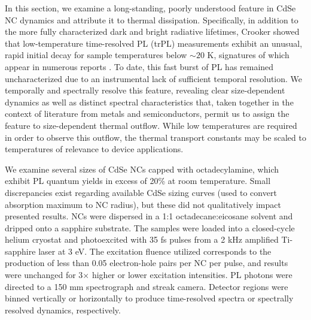 In this section, we examine a long-standing, poorly understood feature in CdSe NC dynamics and attribute it to thermal dissipation. Specifically, in addition to the more fully characterized dark and bright radiative lifetimes, Crooker showed that low-temperature time-resolved PL (trPL) measurements exhibit an unusual, rapid initial decay for sample temperatures below $\sim 20$ K, signatures of which appear in numerous reports \cite{:/content/aip/journal/jcp/96/2/10.1063/1.462114, :/content/aip/journal/apl/82/17/10.1063/1.1570923, doi:10.1021/jp051738b, PhysRevB.74.085320, PhysRevLett.102.177402}.  To date, this fast burst of PL has remained uncharacterized due to an instrumental lack of sufficient temporal resolution. We temporally and spectrally resolve this feature, revealing clear size-dependent dynamics as well as distinct spectral characteristics that, taken together in the context of literature from metals and semiconductors, permit us to assign the feature to size-dependent thermal outflow. While low temperatures are required in order to observe this outflow, the thermal transport constants may be scaled to temperatures of relevance to device applications.  \par

We examine several sizes of CdSe NCs capped with octadecylamine, which exhibit PL quantum yields in excess of 20\% at room temperature. Small discrepancies exist regarding available CdSe sizing curves (used to convert absorption maximum to NC radius), but these did not qualitatively impact presented results. NCs were dispersed in a 1:1 octadecane:eicosane solvent and dripped onto a sapphire substrate. The samples were loaded into a closed-cycle helium cryostat and photoexcited with 35 fs pulses from a 2 kHz amplified Ti-sapphire laser at 3 eV. The excitation fluence utilized corresponds to the production of less than 0.05 electron-hole pairs per NC per pulse, and results were unchanged for 3$\times$ higher or lower excitation intensities. PL photons were directed to a 150 mm spectrograph and streak camera. Detector regions were binned vertically or horizontally to produce time-resolved spectra or spectrally resolved dynamics, respectively. \par

